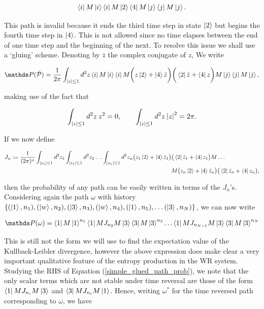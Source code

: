 $$\bra{i}M\ket{i}\bra{i}M\ket{2}\bra{4}M\ket{j}\bra{j}M\ket{j}. $$

This path is invalid because it ends the third time step in state $\ket{2}$ but begins the fourth time step in $\ket{4}$. This is not allowed since no time elapses between the end of one time step and the beginning of the next. To resolve this issue we shall use a `gluing' scheme. Denoting by $\bar{z}$ the complex conjugate of $z$, We write

\begin{equation}
  \bP (\bar{\mathcal{P}}) = \frac{1}{2\pi}\int_{\abs{z} \leq 1}d^2z\bra{i}M\ket{i}\bra{i}M\bigg(z\ket{2} + \ket{4}\bar{z}\bigg)\bigg(\bra{2}\bar{z}+ \bra{4}z \bigg)M\ket{j}\bra{j}M\ket{j},
\end{equation}

making use of the fact that

\begin{equation}
  \int_{\abs{z}\leq 1} d^2z \:z^2 = 0, \quad \quad \int_{\abs{z}\leq 1}d^2z \:\abs{z}^2 = 2\pi.
\end{equation}

If we now define

\begin{align}
  J_n \coloneqq \frac{1}{(2\pi)^n} \int_{\abs{z_1} \leq 1}d^2z_1\int_{\abs{z_1} \leq 1}d^2z_2\ldots \int_{\abs{z_n} \leq 1}d^2z_n \big(z_1\ket{2} + \ket{4}\bar{z}_1\big)&\big(\bra{2}\bar{z}_1+ \bra{4}z_1 \big)M\ldots \nonumber \\  & M\big(z_n\ket{2} + \ket{4}\bar{z}_n\big)\big(\bra{2}\bar{z}_n+ \bra{4}z_n \big),
\end{align}

then the probability of any path can be easily written in terms of the $J_n$'s. Considering again the path $\omega$ with history $\{(\ket{1}, n_1), (\ket{w}, n_2), (\ket{3}, n_3), (\ket{w}, n_4), (\ket{1}, n_5), \ldots (\ket{3}, n_N)\}$, we can now write

\begin{align}\label{simple_glued_path_prob}
  \bP(\omega) = \bra{1}M\ket{1}^{n_1}\bra{1}MJ_{n_2}M\ket{3}\bra{3}M\ket{3}^{n_3}\ldots \bra{1}MJ_{n_{N-1}}M\ket{3}\bra{3}M\ket{3}^{n_N}
\end{align}

This is still not the form we will use to find the expectation value of the Kullback-Leibler divergence, however the above expression does make clear a very important qualitative feature of the entropy production in the WR system. Studying the RHS of Equation (\ref{simple_glued_path_prob}), we note that the only scalar terms which are not stable under time reversal are those of the form $\bra{1}MJ_{n_i}M\ket{3}$ and $\bra{3}MJ_{n_i}M\ket{1}$. Hence, writing $\omega^\ast$ for the time reversed path corresponding to $\omega$, we have

